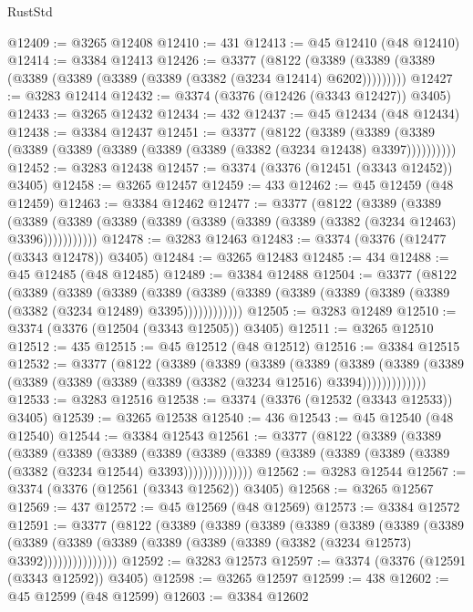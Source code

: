 \begin{lexlean}{RustStd}
\begin{coremodule}
@12409 := @3265 @12408
@12410 := 431
@12413 := @45 @12410 (@48 @12410)
@12414 := @3384 @12413
@12426 := @3377
    (@8122 (@3389 (@3389 (@3389 (@3389 (@3389 (@3389 (@3389 (@3382 (@3234 @12414) @6202)))))))))
@12427 := @3283 @12414
@12432 := @3374 (@3376 (@12426 (@3343 @12427)) @3405)
@12433 := @3265 @12432
@12434 := 432
@12437 := @45 @12434 (@48 @12434)
@12438 := @3384 @12437
@12451 := @3377
    (@8122
      (@3389 (@3389 (@3389 (@3389 (@3389 (@3389 (@3389 (@3389 (@3382 (@3234 @12438) @3397))))))))))
@12452 := @3283 @12438
@12457 := @3374 (@3376 (@12451 (@3343 @12452)) @3405)
@12458 := @3265 @12457
@12459 := 433
@12462 := @45 @12459 (@48 @12459)
@12463 := @3384 @12462
@12477 := @3377
    (@8122
      (@3389
        (@3389
          (@3389 (@3389 (@3389 (@3389 (@3389 (@3389 (@3389 (@3382 (@3234 @12463) @3396)))))))))))
@12478 := @3283 @12463
@12483 := @3374 (@3376 (@12477 (@3343 @12478)) @3405)
@12484 := @3265 @12483
@12485 := 434
@12488 := @45 @12485 (@48 @12485)
@12489 := @3384 @12488
@12504 := @3377
    (@8122
      (@3389
        (@3389
          (@3389
            (@3389 (@3389 (@3389 (@3389 (@3389 (@3389 (@3389 (@3382 (@3234 @12489) @3395))))))))))))
@12505 := @3283 @12489
@12510 := @3374 (@3376 (@12504 (@3343 @12505)) @3405)
@12511 := @3265 @12510
@12512 := 435
@12515 := @45 @12512 (@48 @12512)
@12516 := @3384 @12515
@12532 := @3377
    (@8122
      (@3389
        (@3389
          (@3389
            (@3389
              (@3389
                (@3389 (@3389 (@3389 (@3389 (@3389 (@3389 (@3382 (@3234 @12516) @3394)))))))))))))
@12533 := @3283 @12516
@12538 := @3374 (@3376 (@12532 (@3343 @12533)) @3405)
@12539 := @3265 @12538
@12540 := 436
@12543 := @45 @12540 (@48 @12540)
@12544 := @3384 @12543
@12561 := @3377
    (@8122
      (@3389
        (@3389
          (@3389
            (@3389
              (@3389
                (@3389
                  (@3389
                    (@3389 (@3389 (@3389 (@3389 (@3389 (@3382 (@3234 @12544) @3393))))))))))))))
@12562 := @3283 @12544
@12567 := @3374 (@3376 (@12561 (@3343 @12562)) @3405)
@12568 := @3265 @12567
@12569 := 437
@12572 := @45 @12569 (@48 @12569)
@12573 := @3384 @12572
@12591 := @3377
    (@8122
      (@3389
        (@3389
          (@3389
            (@3389
              (@3389
                (@3389
                  (@3389
                    (@3389
                      (@3389 (@3389 (@3389 (@3389 (@3389 (@3382 (@3234 @12573) @3392)))))))))))))))
@12592 := @3283 @12573
@12597 := @3374 (@3376 (@12591 (@3343 @12592)) @3405)
@12598 := @3265 @12597
@12599 := 438
@12602 := @45 @12599 (@48 @12599)
@12603 := @3384 @12602

\end{coremodule}
\end{lexlean}

